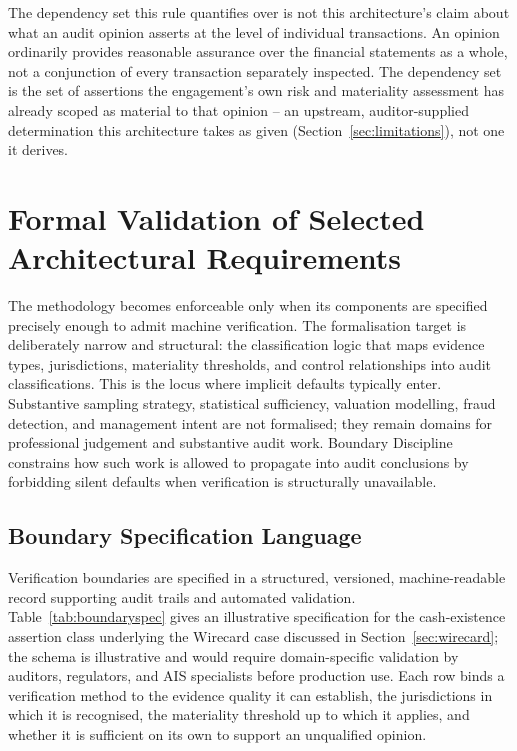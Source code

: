 \documentclass[11pt,a4paper]{article}
\theoremstyle{definition}
\theoremstyle{remark}
\begin{document}
The dependency set this rule quantifies over is not this architecture's claim about what an audit opinion asserts at the level of individual transactions. An opinion ordinarily provides reasonable assurance over the financial statements as a whole, not a conjunction of every transaction separately inspected. The dependency set is the set of assertions the engagement's own risk and materiality assessment has already scoped as material to that opinion -- an upstream, auditor-supplied determination this architecture takes as given (Section~\ref{sec:limitations}), not one it derives.

\section{Formal Validation of Selected Architectural Requirements}
\label{sec:formal}

The methodology becomes enforceable only when its components are specified precisely enough to admit machine verification. The formalisation target is deliberately narrow and structural: the classification logic that maps evidence types, jurisdictions, materiality thresholds, and control relationships into audit classifications. This is the locus where implicit defaults typically enter. Substantive sampling strategy, statistical sufficiency, valuation modelling, fraud detection, and management intent are not formalised; they remain domains for professional judgement and substantive audit work. Boundary Discipline constrains how such work is allowed to propagate into audit conclusions by forbidding silent defaults when verification is structurally unavailable.

\subsection{Boundary Specification Language}
\label{sec:yaml}

Verification boundaries are specified in a structured, versioned, machine-readable record supporting audit trails and automated validation. Table~\ref{tab:boundaryspec} gives an illustrative specification for the cash-existence assertion class underlying the Wirecard case discussed in Section~\ref{sec:wirecard}; the schema is illustrative and would require domain-specific validation by auditors, regulators, and AIS specialists before production use. Each row binds a verification method to the evidence quality it can establish, the jurisdictions in which it is recognised, the materiality threshold up to which it applies, and whether it is sufficient on its own to support an unqualified opinion.
\end{document}
